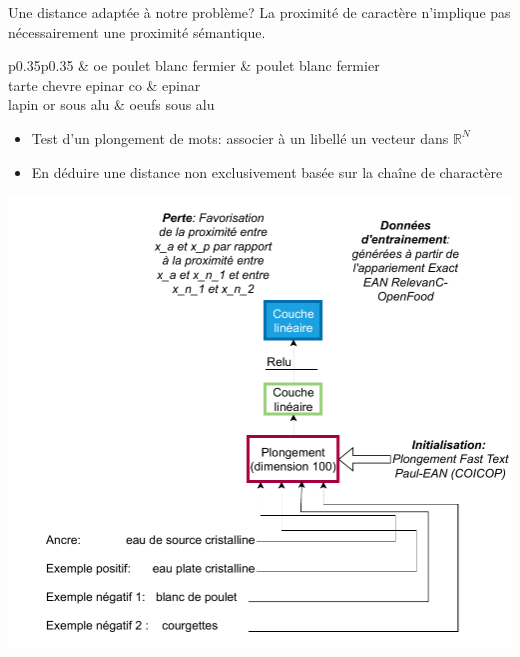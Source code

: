 \documentclass[ignorenonframetext,]{beamer}
\begin{document}
\begin{frame}{Une distance adaptée à notre problème?}
La proximité de caractère n'implique pas nécessairement une proximité sémantique.

\begin{footnotesize}
\begin{tabular}{p{0.35\linewidth}p{0.35\linewidth}}
\toprule
                 &      
\midrule
                  oe poulet blanc fermier &    poulet blanc fermier 	 \\
          tarte chevre epinar co 	 & epinar \\
            lapin or sous alu 	 & oeufs sous alu 	 \\
\bottomrule
\end{tabular}
\end{footnotesize}

\begin{itemize}
    \item Test d'un plongement de mots: associer à un libellé un vecteur dans $\mathbb{R}^N$
    \item En déduire une distance non exclusivement basée sur la chaîne de charactère
\end{itemize}

\end{frame}
\begin{frame}{}
    \includegraphics[width=\linewidth]{images/siamese.pdf}
\end{frame}
\end{document}
